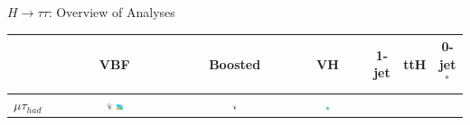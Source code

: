 \documentclass{beamer}
\begin{document}
\begin{frame}{$H \rightarrow \tau \tau$: Overview of Analyses}
	\begin{table}
		\begin{tabular}{c | c | c | c | c | c | c}
		
		
		 & VBF & Boosted & VH & 1-jet & ttH & 0-jet$^*$\\ \hline \hline
		 
				
			$\mu \tau_{had}$ &
			\includegraphics[width=0.05\textwidth]{figures/atlas_logo.pdf} \includegraphics[width=0.05\textwidth]{figures/cms_logo.pdf} &
			\includegraphics[width=0.05\textwidth]{figures/atlas_logo.pdf} &
			\includegraphics[width=0.05\textwidth]{figures/cms_logo.pdf}&


\end{tabular}
\end{table}
\end{frame}
\end{document}
